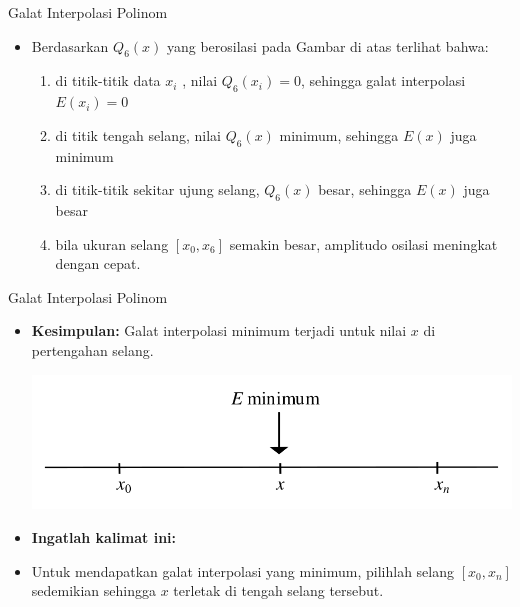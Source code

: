 \documentclass[pdflatex,compress,mathserif]{beamer}
\begin{document}
\begin{frame}{Galat Interpolasi Polinom}
	\begin{itemize}
		\item Berdasarkan $ Q_6(x) $ yang berosilasi pada Gambar di atas terlihat bahwa:
		\begin{enumerate}
			\item di titik-titik data $ x_i $ , nilai $ Q_6(x_i) = 0 $, sehingga galat interpolasi $ E(x_i)=0 $
			\item di titik tengah selang, nilai $ Q_6(x) $ minimum, sehingga $ E(x) $ juga minimum
			\item di titik-titik sekitar ujung selang, $ Q_6(x) $ besar, sehingga $ E(x) $ juga besar
			\item bila ukuran selang $ [x_0 , x_6] $ semakin besar, amplitudo osilasi meningkat dengan cepat.
		\end{enumerate}
	\end{itemize}
\end{frame}

\begin{frame}{Galat Interpolasi Polinom}
	\begin{itemize}
		\item \textbf{Kesimpulan:} Galat interpolasi minimum terjadi untuk nilai $ x $ di pertengahan selang.
		\begin{center}
			\includegraphics[width=0.8\linewidth]{img/img17}
		\end{center}
		\item \textbf{Ingatlah kalimat ini:}
		\item[] Untuk mendapatkan galat interpolasi yang minimum,
		pilihlah selang $ [x_0, x_n] $ sedemikian sehingga $ x $ terletak di tengah selang tersebut.
	\end{itemize}
\end{frame}
\end{document}
